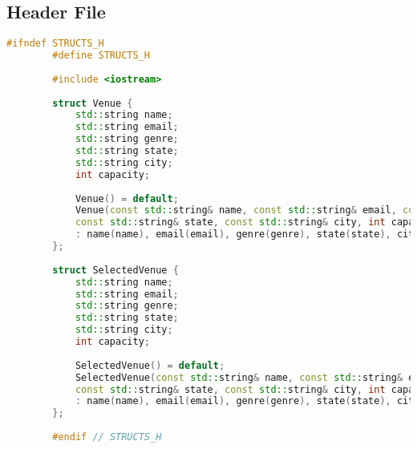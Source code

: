 \documentclass{article}
\begin{document}
	\subsection*{Header File}
	\begin{mdframed}[backgroundcolor=background, hidealllines=false, innerleftmargin=15pt, innerrightmargin=5pt, innertopmargin=0pt, innerbottommargin=-5pt, linecolor=accent]
	\begin{lstlisting}[language=C++]
		#ifndef STRUCTS_H
		#define STRUCTS_H
		
		#include <iostream>
		
		struct Venue {
			std::string name;
			std::string email;
			std::string genre;
			std::string state;
			std::string city;
			int capacity;
			
			Venue() = default;
			Venue(const std::string& name, const std::string& email, const std::string& genre,
			const std::string& state, const std::string& city, int capacity)
			: name(name), email(email), genre(genre), state(state), city(city), capacity(capacity) {}
		};
		
		struct SelectedVenue {
			std::string name;
			std::string email;
			std::string genre;
			std::string state;
			std::string city;
			int capacity;
			
			SelectedVenue() = default;
			SelectedVenue(const std::string& name, const std::string& email, const std::string& genre,
			const std::string& state, const std::string& city, int capacity)
			: name(name), email(email), genre(genre), state(state), city(city), capacity(capacity) {}
		};
		
		#endif // STRUCTS_H
	\end{lstlisting}
	\end{mdframed}
\end{document}

